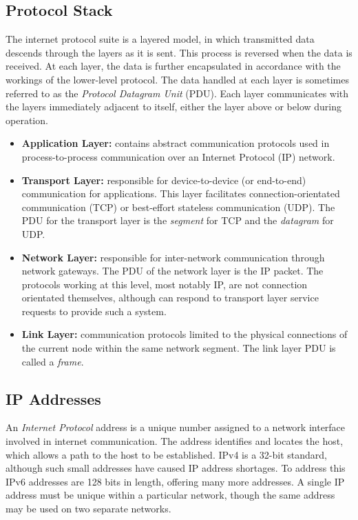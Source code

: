 \documentclass[9pt]{article}
\begin{document}
\subsection{Protocol Stack}
\label{sec:org0775c31}

The internet protocol suite is a layered model, in which transmitted data descends through the layers as it is sent. This process is reversed when the data is received. At each layer, the data is further encapsulated in accordance with the workings of the lower-level protocol. The data handled at each layer is sometimes referred to as the \emph{Protocol Datagram Unit} (PDU). Each layer communicates with the layers immediately adjacent to itself, either the layer above or below during operation.

\begin{itemize}
\item \textbf{Application Layer:} contains abstract communication protocols used in process-to-process communication over an Internet Protocol (IP) network.

\item \textbf{Transport Layer:} responsible for device-to-device (or end-to-end) communication for applications. This layer facilitates connection-orientated communication (TCP) or best-effort stateless communication (UDP). The PDU for the transport layer is the \emph{segment} for TCP and the \emph{datagram} for UDP.

\item \textbf{Network Layer:} responsible for inter-network communication through network gateways. The PDU of the network layer is the IP packet. The protocols working at this level, most notably IP, are not connection orientated themselves, although can respond to transport layer service requests to provide such a system.

\item \textbf{Link Layer:} communication protocols limited to the physical connections of the current node within the same network segment. The link layer PDU is called a \emph{frame}.
\end{itemize}

\subsection{IP Addresses}
\label{sec:orge07cad9}

An \emph{Internet Protocol} address is a unique number assigned to a network interface involved in internet communication. The address identifies and locates the host, which allows a path to the host to be established. IPv4 is a 32-bit standard, although such small addresses have caused IP address shortages. To address this IPv6 addresses are 128 bits in length, offering many more addresses. A single IP address must be unique within a particular network, though the same address may be used on two separate networks.
\end{document}
